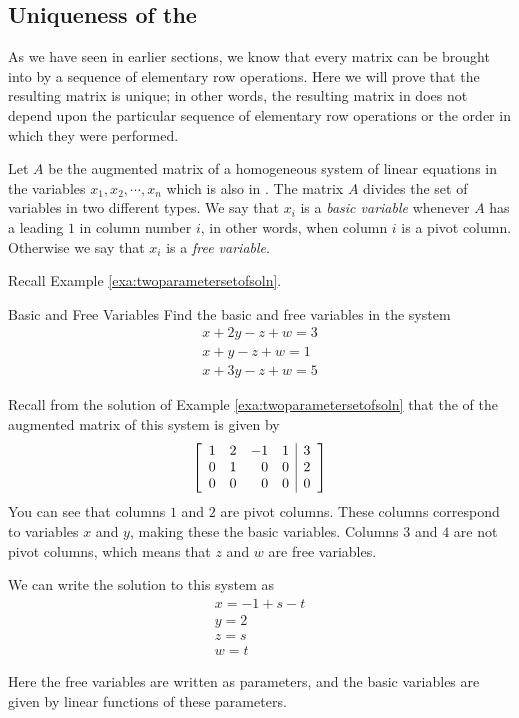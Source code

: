 \subsection{Uniqueness of the\RREF}

As we have seen in earlier sections, we know that every matrix can be brought into \rref \;by a sequence of elementary row operations. Here we will prove that the resulting matrix is unique; in other words, the resulting matrix in \rref\;does not depend upon the particular sequence of elementary row operations or the order in which they were performed. 

Let $A$ be the augmented matrix of a homogeneous system of linear
equations in the variables $x_1, x_2, \cdots, x_n$ which is also in
\rref. The matrix $A$ divides the set of variables in two different
types. We say that $x_i$ is a {\em basic variable}     whenever $A$ has
a leading $1$ in column number $i$, in other words, when column $i$ is
a pivot column. Otherwise we say that $x_i$ is a {\em free
variable\em}. 

Recall Example \ref{exa:twoparametersetofsoln}.

\begin{example}{Basic and Free Variables}\label{exa:basicfree}
Find the basic and free variables in the system
\[
\begin{array}{c}
x+2y-z+w=3 \\
x+y-z+w=1 \\
x+3y-z+w=5
\end{array}
\]
\end{example}

\begin{solution}
Recall from the solution of Example \ref{exa:twoparametersetofsoln} that the \ef \;of the augmented matrix of this system is given by
\[
\left[
\begin{array}{rrrr|r}
1 & 2 & -1 & 1 & 3 \\
0 & 1 & 0 & 0 & 2 \\
0 & 0 & 0 & 0 & 0
\end{array}
\right]  
\]
You can see that columns $1$ and $2$ are pivot columns. These columns correspond to variables $x$ and $y$, making these the basic variables. Columns $3$ and $4$ are not pivot columns, which means that $z$ and $w$ are free variables.

We can write the solution to this system as 
\[
\begin{array}{c}
x=-1+s-t \\
y=2 \\
z=s \\
w=t
\end{array}
\]

Here the free variables are written as parameters, and the basic variables are given by linear functions of these parameters. 
\end{solution}

